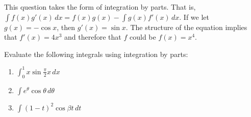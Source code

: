 \begin{Answer}[ref=int_meth3]
This question takes the form of integration by parts. That is, $\int 
f(x)g'(x)\,dx = f(x)g(x) - \int g(x)f'(x)\,dx$. If we let $g(x) = 
-\cos{x}$, then $g'(x) =\sin{x}$. The structure of the equation 
implies that $f'(x) = 4x^3$ and therefore that $f$ could be $f(x) = 
x^4$. 
\end{Answer}

\begin{Exercise}[label = int_meth5]
Evaluate the following integrals using integration by parts:
\begin{enumerate}
\item $\int_0^{1} x \sin{\frac{\pi}{2} x}\,dx$
\item $\int e^{\theta} \cos{\theta}\,d\theta$
\item $\int (1-t)^2 \cos{\beta t}\,dt$
\end{enumerate}
\vspace{60mm}
\end{Exercise}

